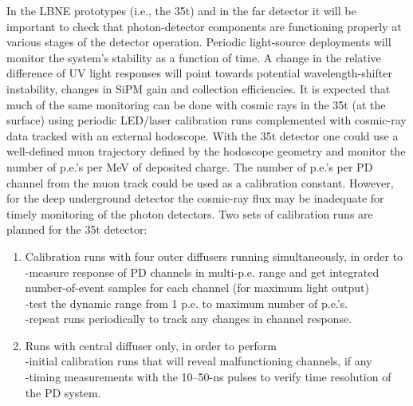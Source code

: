 In the LBNE prototypes (i.e., the 35t) and in %
the far detector it
will be important to check that photon-detector components are
functioning properly at various stages of the detector
operation. Periodic light-source deployments will monitor the system's
stability as a function of time. A change in the relative difference of UV
light responses will point towards potential wavelength-shifter
instability, changes in SiPM gain and collection efficiencies. It is expected that much of
the same monitoring %
can be done with cosmic rays in the
35t (at the surface) using periodic LED/laser calibration runs
complemented with cosmic-ray data tracked with an external
hodoscope.  With the 35t detector one could use a well-defined muon
trajectory defined by the hodoscope geometry and monitor the number of
p.e.'s per MeV of deposited charge. The number of p.e.'s per PD channel from
the %
muon track could be used as a calibration
constant. However, for the deep underground detector the cosmic-ray flux
may be inadequate for timely monitoring of the photon detectors.  Two sets of calibration runs are planned for the 35t detector:
\begin{enumerate}
\item Calibration runs with four outer diffusers running simultaneously,
  in order to\\ -measure response of PD channels in multi-p.e. range and
  get integrated number-of-event samples for each channel (for maximum
  light output)\\ -test the dynamic range from 1 p.e. to maximum
  number of p.e.'s. \\ -repeat runs periodically to track any changes in
  channel response.
       
\item Runs with central diffuser only, in order to perform \\ -initial
  calibration runs that will reveal malfunctioning channels, if
  any\\ -timing measurements with the 10--50-ns pulses to verify time
  resolution of the PD system.
\end{enumerate}

